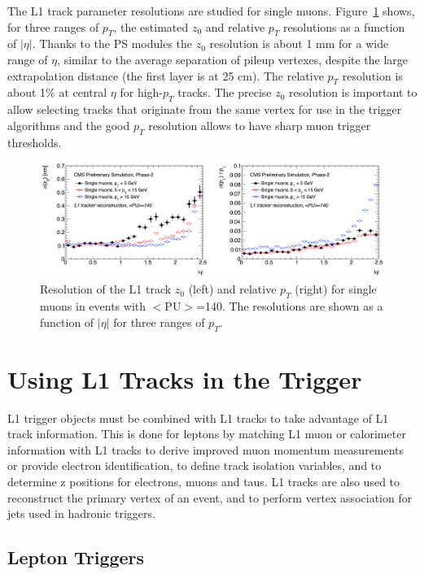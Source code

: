 \documentclass{PoS}
\begin{document}
The L1 track parameter resolutions are studied for single muons. Figure~\ref{fig:Resolution} shows, for three ranges of $p_T$, the estimated $z_0$ and relative $p_T$ resolutions as a function of $|\eta|$. Thanks to the PS modules the $z_0$ resolution is about 1 mm for a wide range of $\eta$, similar to the average separation of pileup vertexes, despite the large extrapolation distance (the first layer is at 25 cm). The relative $p_T$ resolution is about 1\% at central $\eta$ for high-$p_T$ tracks. The precise $z_0$ resolution is important to allow selecting tracks that originate from the same vertex for use in the trigger algorithms and the good $p_T$ resolution allows to have sharp muon trigger thresholds.
\begin{figure}[h!]
  \centering
	\includegraphics[width=\textwidth]{Figures/Resolution.png}
	\caption{Resolution of the L1 track $z_0$ (left) and relative $p_T$ (right) for single muons in events with $<$PU$>$=140. The resolutions are shown as a function of $|\eta|$ for three ranges of $p_T$.}
	\label{fig:Resolution}
\end{figure}

\section{Using L1 Tracks in the Trigger}

L1 trigger objects must be combined with L1 tracks to take advantage of L1 track information. This is done for leptons by matching L1 muon or calorimeter information with L1 tracks to derive improved muon momentum measurements or provide electron identification, to define track isolation variables, and to determine z positions for electrons, muons and taus. L1 tracks are also used to reconstruct the primary vertex of an event, and to perform vertex association for jets used in hadronic triggers.

\subsection{Lepton Triggers}
\end{document}
